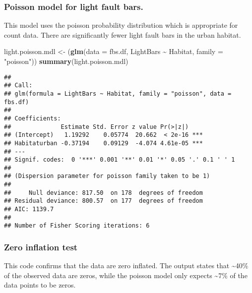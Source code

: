\documentclass[
]{article}
\newenvironment{Shaded}{\begin{snugshade}}{\end{snugshade}}
\newcommand{\AttributeTok}[1]{\textcolor[rgb]{0.13,0.29,0.53}{#1}}
\newcommand{\CommentTok}[1]{\textcolor[rgb]{0.56,0.35,0.01}{\textit{#1}}}
\newcommand{\DecValTok}[1]{\textcolor[rgb]{0.00,0.00,0.81}{#1}}
\newcommand{\FunctionTok}[1]{\textcolor[rgb]{0.13,0.29,0.53}{\textbf{#1}}}
\newcommand{\NormalTok}[1]{#1}
\newcommand{\OtherTok}[1]{\textcolor[rgb]{0.56,0.35,0.01}{#1}}
\newcommand{\SpecialCharTok}[1]{\textcolor[rgb]{0.81,0.36,0.00}{\textbf{#1}}}
\newcommand{\StringTok}[1]{\textcolor[rgb]{0.31,0.60,0.02}{#1}}
\begin{document}
\subsubsection{Poisson model for light fault
bars.}\label{poisson-model-for-light-fault-bars.}

This model uses the poisson probability distribution which is
appropriate for count data. There are significantly fewer light fault
bars in the urban habitat.

\begin{Shaded}
\begin{Highlighting}[]
\NormalTok{light.poisson.mdl }\OtherTok{\textless{}{-}}\NormalTok{ (}\FunctionTok{glm}\NormalTok{(}\AttributeTok{data =}\NormalTok{ fbs.df, LightBars }\SpecialCharTok{\textasciitilde{}}\NormalTok{ Habitat, }\AttributeTok{family =} \StringTok{"poisson"}\NormalTok{))}
\FunctionTok{summary}\NormalTok{(light.poisson.mdl)}
\end{Highlighting}
\end{Shaded}

\begin{verbatim}
## 
## Call:
## glm(formula = LightBars ~ Habitat, family = "poisson", data = fbs.df)
## 
## Coefficients:
##              Estimate Std. Error z value Pr(>|z|)    
## (Intercept)   1.19292    0.05774  20.662  < 2e-16 ***
## Habitaturban -0.37194    0.09129  -4.074 4.61e-05 ***
## ---
## Signif. codes:  0 '***' 0.001 '**' 0.01 '*' 0.05 '.' 0.1 ' ' 1
## 
## (Dispersion parameter for poisson family taken to be 1)
## 
##     Null deviance: 817.50  on 178  degrees of freedom
## Residual deviance: 800.57  on 177  degrees of freedom
## AIC: 1139.7
## 
## Number of Fisher Scoring iterations: 6
\end{verbatim}

\subsubsection{Zero inflation test}\label{zero-inflation-test}

This code confirms that the data are zero inflated. The output states
that \textasciitilde40\% of the observed data are zeros, while the
poisson model only expects \textasciitilde7\% of the data points to be
zeros.

\begin{Shaded}
\end{Shaded}
\end{document}
